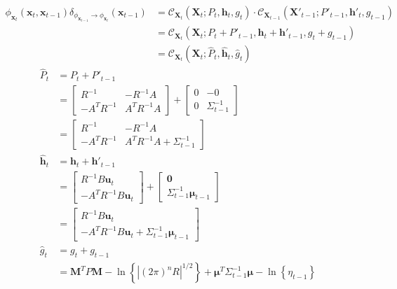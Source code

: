\begin{align}
\phi_{\pmb{x}_{t}}(\pmb{x}_{t}, \pmb{x}_{t-1})  \delta_{\phi_{\pmb{x}_{t-1}} \rightarrow \phi_{\pmb{x}_{t}}} (\pmb{x}_{t-1}) &= 
\mathcal{C}_{\pmb{X}_t} \left( \pmb{X}_t ; P_t, \pmb{h}_{t}, g_{t} \right) \cdot \mathcal{C}_{\pmb{X}_{t-1}} \left( \pmb{X}'_{t-1}; P'_{t-1}, \pmb{h}'_{t}, g_{t-1} \right) \nonumber \\
&= \mathcal{C}_{\pmb{X}_t} \left( \pmb{X}_{t}; P_{t} + P'_{t-1}, \pmb{h}_{t} + \pmb{h}'_{t-1}, g_{t} + g_{t-1} \right) \nonumber \\
&= \mathcal{C}_{\pmb{X}_t} \left( \pmb{X}_{t}; \hat{P}_{t}, \hat{\pmb{h}}_{t}, \hat{g}_{t} \right) 
\end{align}
\begin{align}
\hat{P}_{t} &= P_{t} + P'_{t-1} \nonumber  \\ 
&=  \begin{bmatrix} R^{-1} & -R^{-1} A \\ -A^{T} R^{-1} & A^{T} R^{-1} A \end{bmatrix} +  \begin{bmatrix} 0 & -0 \\ 0 &  \Sigma^{-1}_{t-1} \end{bmatrix} \nonumber \\
&= \begin{bmatrix} R^{-1} & -R^{-1} A \\ -A^{T} R^{-1} & A^{T} R^{-1} A +  \Sigma^{-1}_{t-1} \end{bmatrix} \\
\hat{\pmb{h}}_{t} &= \pmb{h}_t + \pmb{h}'_{t-1} \nonumber \\
&= \begin{bmatrix} R^{-1} B \pmb{u}_{t} \\ - A^{T} R^{-1} B \pmb{u}_{t}  \end{bmatrix} + \begin{bmatrix} \pmb{0} \\ \Sigma_{t-1}^{-1} \pmb{\mu}_{t-1} \end{bmatrix} \nonumber \\
&= \begin{bmatrix} R^{-1} B \pmb{u}_{t} \\ - A^{T} R^{-1} B \pmb{u}_{t} + \Sigma_{t-1}^{-1} \pmb{\mu}_{t-1} \end{bmatrix} \\
\hat{g}_{t} &= g_{t} + g_{t-1} \nonumber \\
&=  \pmb{M}^{T} P \pmb{M} - \ln{ \left\{ | (2 \pi)^{n} R |^{1/2} \right\} } + \pmb{\mu}^{T} \Sigma_{t-1}^{-1} \pmb{\mu} - \ln{ \left\{ \eta_{t-1} \right\} }
\end{align}

